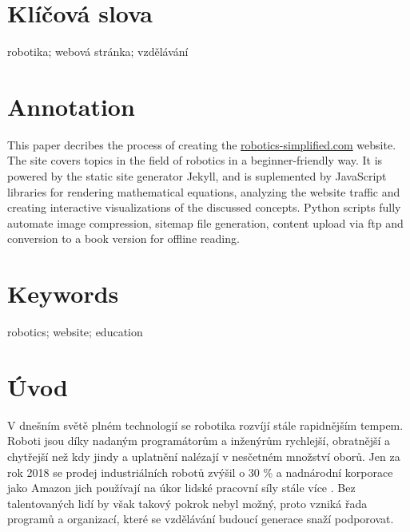 \documentclass[a4paper, 12pt]{article}
\begin{document}
  \section*{\normalfont\textbf{Klíčová slova}}
  robotika; webová stránka; vzdělávání

  \section*{\normalfont\textbf{Annotation}}
  This paper decribes the process of creating the \url{robotics-simplified.com} website. The site covers topics in the field of robotics in a beginner-friendly way. It is powered by the static site generator Jekyll, and is suplemented by JavaScript libraries for rendering mathematical equations, analyzing the website traffic and creating interactive visualizations of the discussed concepts. Python scripts fully automate image compression, sitemap file generation, content upload via \acrshort{ftp} and conversion to a book version for offline reading.

  \section*{\normalfont\textbf{Keywords}}
  robotics; website; education

  \newpage

  \setcounter{savepage}{\value{page}}%

  \tableofcontents

  \newpage

  \printglossary[type=\acronymtype, title=Seznam zkratek]

  \newpage

  \section{Úvod}
  V dnešním světě plném technologií se robotika rozvíjí stále rapidnějším tempem. Roboti jsou díky nadaným programátorům a inženýrům rychlejší, obratnější a chytřejší než kdy jindy a uplatnění nalézají v nesčetném množství oborů. Jen za rok 2018 se prodej industriálních robotů zvýšil o 30 \% \cite{industrial-robot-growth} a nadnárodní korporace jako Amazon jich používají na úkor lidské pracovní síly stále více \cite{amazon-hiring}. Bez talentovaných lidí by však takový pokrok nebyl možný, proto vzniká řada programů a organizací, které se vzdělávání budoucí generace snaží podporovat.
\end{document}

